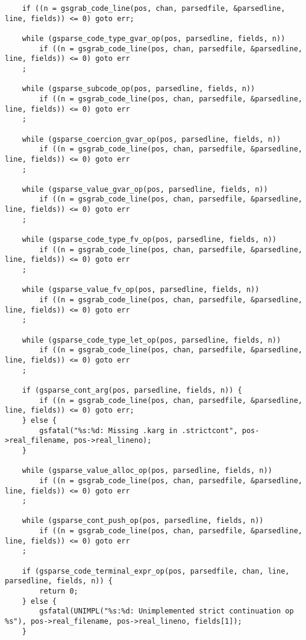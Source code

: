 \documentclass{report}
\begin{document}
\begin{verbatim}
    if ((n = gsgrab_code_line(pos, chan, parsedfile, &parsedline, line, fields)) <= 0) goto err;

    while (gsparse_code_type_gvar_op(pos, parsedline, fields, n))
        if ((n = gsgrab_code_line(pos, chan, parsedfile, &parsedline, line, fields)) <= 0) goto err
    ;

    while (gsparse_subcode_op(pos, parsedline, fields, n))
        if ((n = gsgrab_code_line(pos, chan, parsedfile, &parsedline, line, fields)) <= 0) goto err
    ;

    while (gsparse_coercion_gvar_op(pos, parsedline, fields, n))
        if ((n = gsgrab_code_line(pos, chan, parsedfile, &parsedline, line, fields)) <= 0) goto err
    ;

    while (gsparse_value_gvar_op(pos, parsedline, fields, n))
        if ((n = gsgrab_code_line(pos, chan, parsedfile, &parsedline, line, fields)) <= 0) goto err
    ;

    while (gsparse_code_type_fv_op(pos, parsedline, fields, n))
        if ((n = gsgrab_code_line(pos, chan, parsedfile, &parsedline, line, fields)) <= 0) goto err
    ;

    while (gsparse_value_fv_op(pos, parsedline, fields, n))
        if ((n = gsgrab_code_line(pos, chan, parsedfile, &parsedline, line, fields)) <= 0) goto err
    ;

    while (gsparse_code_type_let_op(pos, parsedline, fields, n))
        if ((n = gsgrab_code_line(pos, chan, parsedfile, &parsedline, line, fields)) <= 0) goto err
    ;

    if (gsparse_cont_arg(pos, parsedline, fields, n)) {
        if ((n = gsgrab_code_line(pos, chan, parsedfile, &parsedline, line, fields)) <= 0) goto err;
    } else {
        gsfatal("%s:%d: Missing .karg in .strictcont", pos->real_filename, pos->real_lineno);
    }

    while (gsparse_value_alloc_op(pos, parsedline, fields, n))
        if ((n = gsgrab_code_line(pos, chan, parsedfile, &parsedline, line, fields)) <= 0) goto err
    ;

    while (gsparse_cont_push_op(pos, parsedline, fields, n))
        if ((n = gsgrab_code_line(pos, chan, parsedfile, &parsedline, line, fields)) <= 0) goto err
    ;

    if (gsparse_code_terminal_expr_op(pos, parsedfile, chan, line, parsedline, fields, n)) {
        return 0;
    } else {
        gsfatal(UNIMPL("%s:%d: Unimplemented strict continuation op %s"), pos->real_filename, pos->real_lineno, fields[1]);
    }


\end{verbatim}
\end{document}
